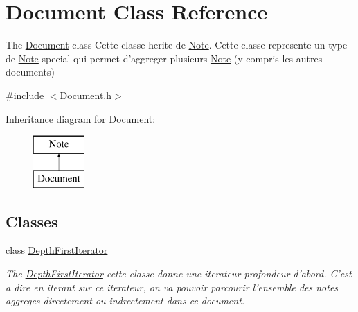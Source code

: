 \hypertarget{class_document}{\section{Document Class Reference}
\label{class_document}
}


The \hyperlink{class_document}{Document} class Cette classe herite de \hyperlink{class_note}{Note}. Cette classe represente un type de \hyperlink{class_note}{Note} special qui permet d'aggreger plusieurs \hyperlink{class_note}{Note} (y compris les autres documents)  




{\ttfamily \#include $<$Document.\-h$>$}

Inheritance diagram for Document\-:\begin{figure}[H]
\begin{center}
\leavevmode
\includegraphics[height=2.000000cm]{class_document}
\end{center}
\end{figure}
\subsection*{Classes}
\begin{DoxyCompactItemize}
\item 
class \hyperlink{class_document_1_1_depth_first_iterator}{Depth\-First\-Iterator}
\begin{DoxyCompactList}\small\item\em The \hyperlink{class_document_1_1_depth_first_iterator}{Depth\-First\-Iterator} cette classe donne une iterateur profondeur d'abord. C'est a dire en iterant sur ce iterateur, on va pouvoir parcourir l'ensemble des notes aggreges directement ou indrectement dans ce document. \end{DoxyCompactList}\end{DoxyCompactItemize}
